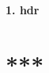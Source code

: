 \documentclass[
candidate, %
subf, %
times %
]{disser}
\begin{document}
	
	
	
	\newpage
	\begin{center}
		\textbf{\large 1. hdr}
	\end{center}
	
	\section {***}
	
	
	
	
	
\end{document}
